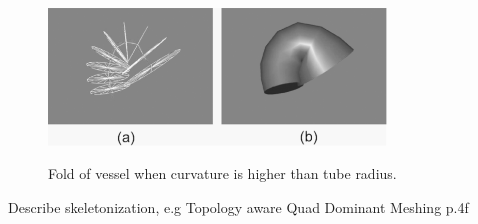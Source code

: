 \begin{figure}[h]
	\centering
	\includegraphics[width=0.8\textwidth]{./Images/Fold_of_vessel.png} \\
	\caption{Fold of vessel when curvature is higher than tube radius.}
	\label{fig:Fold_of_vessel}
\end{figure}


Describe skeletonization, e.g Topology aware Quad Dominant Meshing p.4f